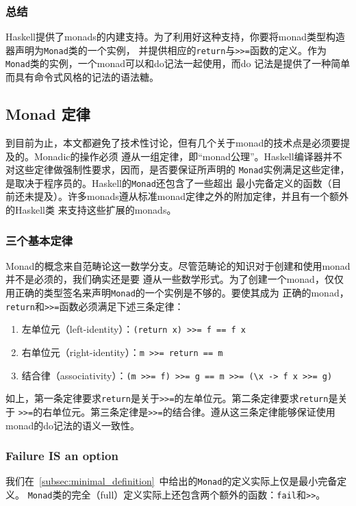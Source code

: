 \vspace{-0.5em}
\subsubsection{总结}
\indent{} Haskell提供了monads的内建支持。为了利用好这种支持，你要将monad类型构造器声明为\texttt{Monad}类的一个实例，
并提供相应的\texttt{return}与\texttt{>>=}函数的定义。作为\texttt{Monad}类的实例，一个monad可以和do记法一起使用，而do
记法是提供了一种简单而具有命令式风格的记法的语法糖。
\clearpage

\subsection{Monad 定律}
\indent{}到目前为止，本文都避免了技术性讨论，但有几个关于monad的技术点是必须要提及的。Monadic的操作必须
遵从一组定律，即“monad公理”。Haskell编译器并不对这些定律做强制性要求，因而，是否要保证所声明的
\texttt{Monad}实例满足这些定律，是取决于程序员的。Haskell的\texttt{Monad}还包含了一些超出
最小完备定义的函数（目前还未提及）。许多monads遵从标准monad定律之外的附加定律，并且有一个额外的Haskell类
来支持这些扩展的monads。

\subsubsection{三个基本定律}
\indent{}Monad的概念来自范畴论这一数学分支。尽管范畴论的知识对于创建和使用monad并不是必须的，我们确实还是要
遵从一些数学形式。为了创建一个monad，仅仅用正确的类型签名来声明\texttt{Monad}的一个实例是不够的。要使其成为
正确的monad，\texttt{return}和\texttt{>>=}函数必须满足下述三条定律：
\begin{enumerate}
\item 左单位元（left-identity）：\texttt{(return x) >>= f  ==  f x}
\item 右单位元（right-identity）：\texttt{m >>= return  ==  m}
\item 结合律（associativity）：\texttt{(m >>= f) >>= g  ==  m >>= (\textbackslash x -> f x >>= g)}
\end{enumerate}
如上，\noindent{}第一条定律要求\texttt{return}是关于\texttt{>>=}的左单位元。第二条定律要求\texttt{return}是关于
\texttt{>>=}的右单位元。第三条定律是\texttt{>>=}的结合律。遵从这三条定律能够保证使用monad的do记法的语义一致性。

\subsubsection{Failure IS an option}
\indent{}我们在~\ref{subsec:minimal_definition}~中给出的\texttt{Monad}的定义实际上仅是最小完备定义。
\texttt{Monad}类的完全（full）定义实际上还包含两个额外的函数：\texttt{fail}和\texttt{>>}。

